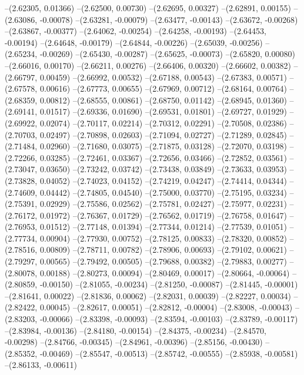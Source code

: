 --(2.62305, 0.01366)
--(2.62500, 0.00730)
--(2.62695, 0.00327)
--(2.62891, 0.00155)
--(2.63086, -0.00078)
--(2.63281, -0.00079)
--(2.63477, -0.00143)
--(2.63672, -0.00268)
--(2.63867, -0.00377)
--(2.64062, -0.00254)
--(2.64258, -0.00193)
--(2.64453, -0.00194)
--(2.64648, -0.00179)
--(2.64844, -0.00226)
--(2.65039, -0.00256)
--(2.65234, -0.00269)
--(2.65430, -0.00287)
--(2.65625, -0.00073)
--(2.65820, 0.00080)
--(2.66016, 0.00170)
--(2.66211, 0.00276)
--(2.66406, 0.00320)
--(2.66602, 0.00382)
--(2.66797, 0.00459)
--(2.66992, 0.00532)
--(2.67188, 0.00543)
--(2.67383, 0.00571)
--(2.67578, 0.00616)
--(2.67773, 0.00655)
--(2.67969, 0.00712)
--(2.68164, 0.00764)
--(2.68359, 0.00812)
--(2.68555, 0.00861)
--(2.68750, 0.01142)
--(2.68945, 0.01360)
--(2.69141, 0.01517)
--(2.69336, 0.01690)
--(2.69531, 0.01801)
--(2.69727, 0.01929)
--(2.69922, 0.02074)
--(2.70117, 0.02214)
--(2.70312, 0.02291)
--(2.70508, 0.02386)
--(2.70703, 0.02497)
--(2.70898, 0.02603)
--(2.71094, 0.02727)
--(2.71289, 0.02845)
--(2.71484, 0.02960)
--(2.71680, 0.03075)
--(2.71875, 0.03128)
--(2.72070, 0.03198)
--(2.72266, 0.03285)
--(2.72461, 0.03367)
--(2.72656, 0.03466)
--(2.72852, 0.03561)
--(2.73047, 0.03650)
--(2.73242, 0.03742)
--(2.73438, 0.03849)
--(2.73633, 0.03953)
--(2.73828, 0.04052)
--(2.74023, 0.04152)
--(2.74219, 0.04247)
--(2.74414, 0.04344)
--(2.74609, 0.04442)
--(2.74805, 0.04540)
--(2.75000, 0.03770)
--(2.75195, 0.03234)
--(2.75391, 0.02929)
--(2.75586, 0.02562)
--(2.75781, 0.02427)
--(2.75977, 0.02231)
--(2.76172, 0.01972)
--(2.76367, 0.01729)
--(2.76562, 0.01719)
--(2.76758, 0.01647)
--(2.76953, 0.01512)
--(2.77148, 0.01394)
--(2.77344, 0.01214)
--(2.77539, 0.01051)
--(2.77734, 0.00904)
--(2.77930, 0.00752)
--(2.78125, 0.00833)
--(2.78320, 0.00852)
--(2.78516, 0.00809)
--(2.78711, 0.00782)
--(2.78906, 0.00693)
--(2.79102, 0.00621)
--(2.79297, 0.00565)
--(2.79492, 0.00505)
--(2.79688, 0.00382)
--(2.79883, 0.00277)
--(2.80078, 0.00188)
--(2.80273, 0.00094)
--(2.80469, 0.00017)
--(2.80664, -0.00064)
--(2.80859, -0.00150)
--(2.81055, -0.00234)
--(2.81250, -0.00087)
--(2.81445, -0.00001)
--(2.81641, 0.00022)
--(2.81836, 0.00062)
--(2.82031, 0.00039)
--(2.82227, 0.00034)
--(2.82422, 0.00045)
--(2.82617, 0.00051)
--(2.82812, -0.00004)
--(2.83008, -0.00043)
--(2.83203, -0.00066)
--(2.83398, -0.00093)
--(2.83594, -0.00103)
--(2.83789, -0.00117)
--(2.83984, -0.00136)
--(2.84180, -0.00154)
--(2.84375, -0.00234)
--(2.84570, -0.00298)
--(2.84766, -0.00345)
--(2.84961, -0.00396)
--(2.85156, -0.00430)
--(2.85352, -0.00469)
--(2.85547, -0.00513)
--(2.85742, -0.00555)
--(2.85938, -0.00581)
--(2.86133, -0.00611)
